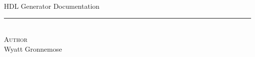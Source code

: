 \documentclass[12pt,letterpaper,oneside]{article}
\renewcommand{\thesubsection}{3}
\newcommand{\HRule}{\rule{\linewidth}{0.5mm}}
\begin{document}
\begin{titlepage}
\begin{center}
{\LARGE HDL Generator Documentation\\[1cm]}

\HRule \\[1.0cm]
{\LARGE \textsc{Author}\\[0.1cm]}
{\LARGE Wyatt Gronnemose\\[0.2cm]}

\thispagestyle{empty} %
\clearpage
\end{center}
\end{titlepage}

\setcounter{page}{2}

\newpage
\singlespacing

\setcounter{tocdepth}{3}
\setcounter{secnumdepth}{3}

\tableofcontents
\listoffigures
\newpage

\flushleft

\setcounter{section}{0}
\setcounter{subsection}{0}
\setcounter{subsubsection}{0}

\renewcommand{\thesection}{\arabic{section}}

\renewcommand{\thesubsection}{\arabic{section}.\arabic{subsection}}

\renewcommand{\thesubsubsection}{\arabic{section}.\arabic{subsection}.\arabic{subsubsection}}



\end{document}
